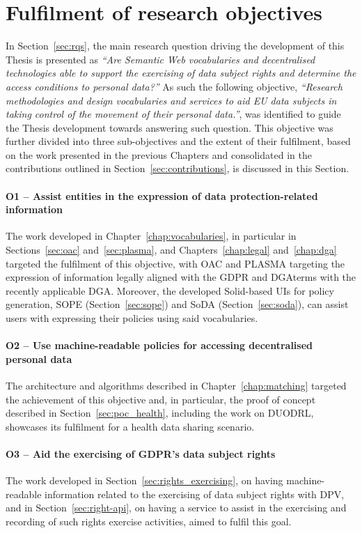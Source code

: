 \section{Fulfilment of research objectives}
\label{sec:fulfilment}

In Section~\ref{sec:rqs}, the main research question driving the development of this Thesis is presented as 
\textit{``Are Semantic Web vocabularies and decentralised technologies able to support the exercising of data subject rights and determine the access conditions to personal data?''}
As such the following objective,
\textit{``Research methodologies and design vocabularies and services to aid EU data subjects in taking control of the movement of their personal data.''},
was identified to guide the Thesis development towards answering such question.
This objective was further divided into three sub-objectives and the extent of their fulfilment, based on the work presented in the previous Chapters and consolidated in the contributions outlined in Section~\ref{sec:contributions}, is discussed in this Section.

\paragraph{O1 -- Assist entities in the expression of data protection-related information} The work developed in Chapter~\ref{chap:vocabularies}, in particular in Sections~\ref{sec:oac} and~\ref{sec:plasma}, and Chapters~\ref{chap:legal} and~\ref{chap:dga} targeted the fulfilment of this objective, with OAC and PLASMA targeting the expression of information legally aligned with the GDPR and DGAterms with the recently applicable DGA. Moreover, the developed Solid-based UIs for policy generation, SOPE (Section~\ref{sec:sope}) and SoDA (Section~\ref{sec:soda}), can assist users with expressing their policies using said vocabularies.

\paragraph{O2 -- Use machine-readable policies for accessing decentralised personal data} The architecture and algorithms described in Chapter~\ref{chap:matching} targeted the achievement of this objective and, in particular, the proof of concept described in Section~\ref{sec:poc_health}, including the work on DUODRL, showcases its fulfilment for a health data sharing scenario.

\paragraph{O3 -- Aid the exercising of GDPR’s data subject rights} The work developed in Section~\ref{sec:rights_exercising}, on having machine-readable information related to the exercising of data subject rights with DPV, and in Section~\ref{sec:right-api}, on having a service to assist in the exercising and recording of such rights exercise activities, aimed to fulfil this goal. 

